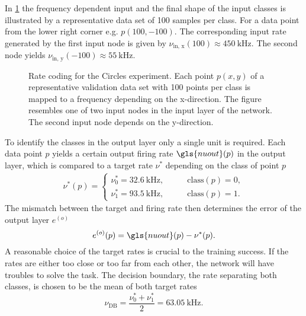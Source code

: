 In \cref{circlesinputs} the frequency dependent input and the final shape of the input classes is illustrated by a representative data set of 100 samples per class. For a data point from the lower right corner e.g. $p(100,-100)$. The corresponding input rate generated by the first input node is given by $\nu_{\text{in, x}}(100) \approx \SI{450}{\kilo \Hz}$. The second node yields $\nu_{\text{in, y}}(-100) \approx \SI{55}{\kilo \Hz}$.
\begin{figure}[htb!]
	\begin{subfigure}[c]{0.5\textwidth}
		\centering
	\end{subfigure}
	\begin{subfigure}[c]{0.5\textwidth}
		\centering
	\end{subfigure}
	\caption[Rate coding for the Circles experiment.]{Rate coding for the Circles experiment. Each point $p(x,y)$ of a representative validation data set with 100 points per class is mapped to a frequency depending on the x-direction. The figure resembles one of two input nodes in the input layer of the network. The second input node depends on the y-direction.}
	\label{circlesinputs}
\end{figure}
To identify the classes in the output layer only a single unit is required. Each data point $p$ yields a certain output firing rate $\gls{nuout}(p)$ in the output layer, which is compared to a target rate $\nu^*$ depending on the class of point $p$
\begin{align}
\nu^*(p) =
\begin{cases}
\nu_0^* = \SI{32.6}{\kilo \Hz} ,&\quad \quad \text{class}(p) = 0,\\
\nu_1^* = \SI{93.5}{\kilo \Hz} ,&\quad \quad \text{class}(p) = 1.
\end{cases}
\label{circlestarget}
\end{align}
The mismatch between the target and firing rate then determines the error of the output layer $e^{(o)}$
\begin{equation*}
e^{(o)}(p) = \gls{nuout}(p) - \nu^*(p).
\label{circleserror}
\end{equation*}
A reasonable choice of the target rates is crucial to the training success. If the rates are either too close or too far from each other, the network will have troubles to solve the task. The decision boundary, the rate separating both classes, is chosen to be the mean of both target rates
\begin{equation*}
\nu_\text{DB} = \frac{\nu_0^* + \nu_1^*}{2} = \SI{63.05}{\kilo \Hz}.
\label{circlesdb}
\end{equation*}


